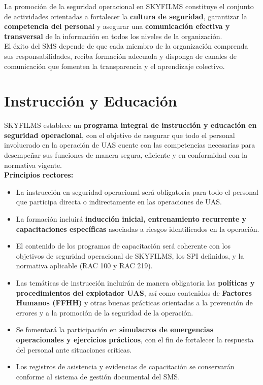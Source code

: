 La promoción de la seguridad operacional en SKYFILMS constituye el conjunto de actividades orientadas a fortalecer la \textbf{cultura de seguridad}, garantizar la \textbf{competencia del personal} y asegurar una \textbf{comunicación efectiva y transversal} de la información en todos los niveles de la organización.\\

El éxito del SMS depende de que cada miembro de la organización comprenda sus responsabilidades, reciba formación adecuada y disponga de canales de comunicación que fomenten la transparencia y el aprendizaje colectivo.

\section{Instrucción y Educación}
SKYFILMS establece un \textbf{programa integral de instrucción y educación en seguridad operacional}, con el objetivo de asegurar que todo el personal involucrado en la operación de UAS cuente con las competencias necesarias para desempeñar sus funciones de manera segura, eficiente y en conformidad con la normativa vigente.\\

\textbf{Principios rectores:}

\begin{itemize}
    \item La instrucción en seguridad operacional será obligatoria para todo el personal que participa directa o indirectamente en las operaciones de UAS.
    \item La formación incluirá \textbf{inducción inicial, entrenamiento recurrente y capacitaciones específicas} asociadas a riesgos identificados en la operación.
    \item El contenido de los programas de capacitación será coherente con los objetivos de seguridad operacional de SKYFILMS, los SPI definidos, y la normativa aplicable (RAC 100 y RAC 219).
    \item Las temáticas de instrucción incluirán de manera obligatoria las \textbf{políticas y procedimientos del explotador UAS}, así como contenidos de \textbf{Factores Humanos (FFHH)} y otras buenas prácticas orientadas a la prevención de errores y a la promoción de la seguridad de la operación.
    \item Se fomentará la participación en \textbf{simulacros de emergencias operacionales y ejercicios prácticos}, con el fin de fortalecer la respuesta del personal ante situaciones críticas.
    \item Los registros de asistencia y evidencias de capacitación se conservarán conforme al sistema de gestión documental del SMS.
\end{itemize}

